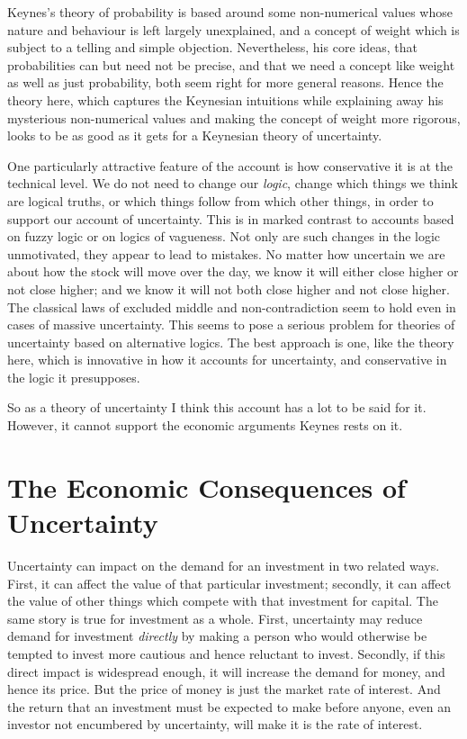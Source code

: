 Keynes's theory of probability is based around some non-numerical values whose nature and behaviour is left largely unexplained, and a concept of weight which is subject to a telling and simple objection. Nevertheless, his core ideas, that probabilities can but need not be precise, and that we need a concept like weight as well as just probability, both seem right for more general reasons. Hence the theory here, which captures the Keynesian intuitions while explaining away his mysterious non-numerical values and making the concept of weight more rigorous, looks to be as good as it gets for a Keynesian theory of uncertainty. 

One particularly attractive feature of the account is how conservative it is at the technical level. We do not need to change our \textit{logic}, change which things we think are logical truths, or which things follow from which other things, in order to support our account of uncertainty. This is in marked contrast to accounts based on fuzzy logic or on logics of vagueness. Not only are such changes in the logic unmotivated, they appear to lead to mistakes. No matter how uncertain we are about how the stock will move over the day, we know it will either close higher or not close higher; and we know it will not both close higher and not close higher. The classical laws of excluded middle and non-contradiction seem to hold even in cases of massive uncertainty. This seems to pose a serious problem for theories of uncertainty based on alternative logics. The best approach is one, like the theory here, which is innovative in how it accounts for uncertainty, and conservative in the logic it presupposes.

So as a theory of uncertainty I think this account has a lot to be said for it. However, it cannot support the economic arguments Keynes rests on it.

\section{The Economic Consequences of Uncertainty}
Uncertainty can impact on the demand for an investment in two related ways. First, it can affect the value of that particular investment; secondly, it can affect the value of other things which compete with that investment for capital. The same story is true for investment as a whole. First, uncertainty may reduce demand for investment \textit{directly} by making a person who would otherwise be tempted to invest more cautious and hence reluctant to invest. Secondly, if this direct impact is widespread enough, it will increase the demand for money, and hence its price. But the price of money is just the market rate of interest. And the return that an investment must be expected to make before anyone, even an investor not encumbered by uncertainty, will make it is the rate of interest.

